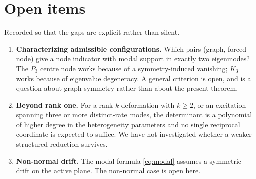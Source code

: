 \documentclass[11pt]{article}
\theoremstyle{plain}
\theoremstyle{definition}
\theoremstyle{remark}
\begin{document}
\appendix

\section{Open items}\label{sec:open}

Recorded so that the gaps are explicit rather than silent.

\begin{enumerate}\itemsep3pt
\item \textbf{Characterizing admissible configurations.} Which pairs (graph, forced node) give a
  node indicator with modal support in exactly two eigenmodes? The $P_3$ centre node works because
  of a symmetry-induced vanishing; $K_3$ works because of eigenvalue degeneracy. A general
  criterion is open, and is a question about graph symmetry rather than about the present theorem.
\item \textbf{Beyond rank one.} For a rank-$k$ deformation with $k\ge2$, or an excitation spanning
  three or more distinct-rate modes, the determinant is a polynomial of higher degree in the
  heterogeneity parameters and no single reciprocal coordinate is expected to suffice. We have not
  investigated whether a weaker structured reduction survives.
\item \textbf{Non-normal drift.} The modal formula \eqref{eq:modal} assumes a symmetric drift on
  the active plane. The non-normal case is open here.
\end{enumerate}



\end{document}
